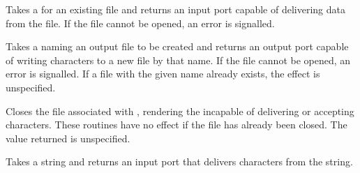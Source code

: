 \begin{entry}{%
}
 
Takes a  for an existing file and returns an input port capable of
delivering data from the file.  If the file cannot be opened, an error is
signalled.

\end{entry}


\begin{entry}{%
}

Takes a  naming an output file to be created and returns an output
port capable of writing characters to a new file by that name.  If the file
cannot be opened, an error is signalled.  If a file with the given name
already exists, the effect is unspecified.

\end{entry}


\begin{entry}{%
}

Closes the file associated with , rendering the 
incapable of delivering or accepting characters.  
These routines have no effect if the file has already been closed.
The value returned is unspecified.



\end{entry}


\begin{entry}{%
}

Takes a string and returns an input port that delivers characters from
the string.


\end{entry}

